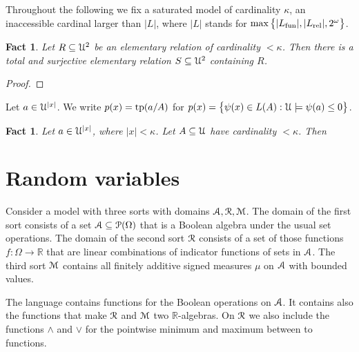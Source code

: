 \documentclass[12pt,letterpaper,oneside,reqno]{amsart}
\theoremstyle{plain}
\newtheorem{fact}[theorem]{Fact}
\theoremstyle{remark}
\renewcommand*{\emph}[1]{%
   \smash{\tikz[baseline]\node[rectangle, fill=olive!25, rounded corners, inner xsep=0.5ex, inner ysep=0.2ex, anchor=base, minimum height = 2.7ex]{#1};}}
\begin{document}
Throughout the following we fix a saturated model \emph{$\EuScript U$\/} of cardinality $\kappa$, an inaccessible cardinal larger than $|L|$, where $|L|$ stands for $\max\big\{|L_{\rm fun}|,|L_{\rm rel}|,2^\omega\big\}$.

\begin{fact}
  Let $R\subseteq{\EuScript U}^2$ be an elementary relation of cardinality $<\kappa$.
  Then there is a total and surjective elementary relation $S\subseteq{\EuScript U}^2$ containing $R$.
\end{fact}

\begin{proof}

\end{proof}

Let $a\in{\EuScript U}^{|x|}$.
We write $p(x)={\rm tp}(a/A)$ for $p(x)=\big\{\psi(x)\in L(A):{\EuScript U}\models \psi(a)\le0\big\}$.


\begin{fact}
  Let $a\in{\EuScript U}^{|x|}$, where $|x|<\kappa$.
  Let $A\subseteq{\EuScript U}$ have cardinality $<\kappa$.
  Then

\end{fact}



\section{Random variables}

Consider a model with three sorts with domains ${\EuScript A},{\EuScript R},{\EuScript M}$.
The domain of the first sort consists of a set ${\EuScript A}\subseteq{\EuScript P}(\Omega)$ that is a Boolean algebra under the usual set operations.
The domain of the second sort ${\EuScript R}$ consists of a set of those functions $f:\Omega\to{\mathds R}$ that are linear combinations of indicator functions of sets in ${\EuScript A}$.
The third sort ${\EuScript M}$ contains all finitely additive signed measures $\mu$ on ${\EuScript A}$ with bounded values.

The language contains functions for the Boolean operations on ${\EuScript A}$.
It contains also the functions that make ${\EuScript R}$ and ${\EuScript M}$ two ${\mathds R}$-algebras.
On ${\EuScript R}$ we also include the functions $\wedge$ and $\vee$ for the pointwise minimum and maximum between to functions.
\end{document}
